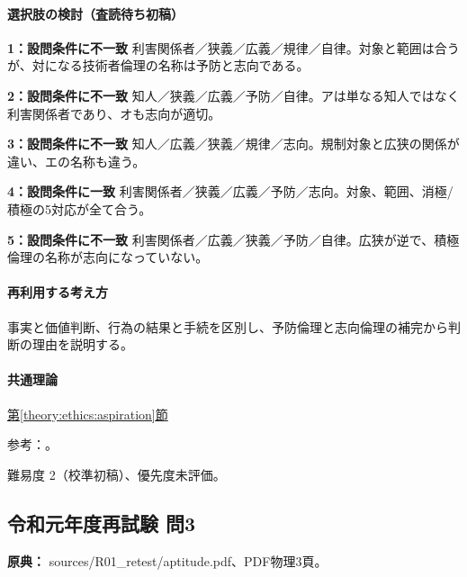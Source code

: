 \paragraph{選択肢の検討（査読待ち初稿）}\mbox{}\par

\noindent\textbf{1：設問条件に不一致} 利害関係者／狭義／広義／規律／自律。対象と範囲は合うが、対になる技術者倫理の名称は予防と志向である。\par

\noindent\textbf{2：設問条件に不一致} 知人／狭義／広義／予防／自律。アは単なる知人ではなく利害関係者であり、オも志向が適切。\par

\noindent\textbf{3：設問条件に不一致} 知人／広義／狭義／規律／志向。規制対象と広狭の関係が違い、エの名称も違う。\par

\noindent\textbf{4：設問条件に一致} 利害関係者／狭義／広義／予防／志向。対象、範囲、消極/積極の5対応が全て合う。\par

\noindent\textbf{5：設問条件に不一致} 利害関係者／広義／狭義／予防／自律。広狭が逆で、積極倫理の名称が志向になっていない。\par

\paragraph{再利用する考え方} 事実と価値判断、行為の結果と手続を区別し、予防倫理と志向倫理の補完から判断の理由を説明する。

\paragraph{共通理論} \hyperref[theory:ethics:aspiration]{第\ref*{theory:ethics:aspiration}節}

\par 参考：\cite{jinji_ethics2017,jinji_ethics_qa,fudano_ethics2021}。

\par 難易度 2（校準初稿）、優先度未評価。

\subsection{令和元年度再試験 問3}
\label{q:r01-ret-apt-03}

\noindent\textbf{原典：} sources/R01\_retest/aptitude.pdf、PDF物理3頁。

